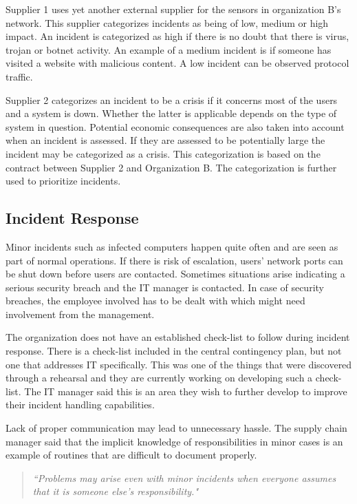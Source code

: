 Supplier 1 uses yet another external supplier for the sensors in organization B's network. This supplier categorizes incidents as being of low, medium or high impact. An incident is categorized as high if there is no doubt that there is virus, trojan or botnet activity. An example of a medium incident is if someone has visited a website with malicious content. A low incident can be observed protocol traffic.

Supplier 2 categorizes an incident to be a crisis if it concerns most of the users and a system is down. Whether the latter is applicable depends on the type of system in question. Potential economic consequences are also taken into account when an incident is assessed. If they are assessed to be potentially large the incident may be categorized as a crisis. This categorization is based on the contract between Supplier 2 and Organization B. The categorization is further used to prioritize incidents.

\subsection{Incident Response}
Minor incidents such as infected computers happen quite often and are seen as part of normal operations. If there is risk of escalation, users' network ports can be shut down before users are contacted. Sometimes situations arise indicating a serious security breach and the IT manager is contacted. In case of security breaches, the employee involved has to be dealt with which might need involvement from the management.

The organization does not have an established check-list to follow during incident response. There is a check-list included in the central contingency plan, but not one that addresses IT specifically. This was one of the things that were discovered through a rehearsal and they are currently working on developing such a check-list. The IT manager said this is an area they wish to further develop to improve their incident handling capabilities. 

Lack of proper communication may lead to unnecessary hassle. The supply chain manager said that the implicit knowledge of responsibilities in minor cases is an example of routines that are difficult to document properly.

\begin{quote}
\textit{``Problems may arise even with minor incidents when everyone assumes that it is someone else's responsibility."}
\end{quote}


